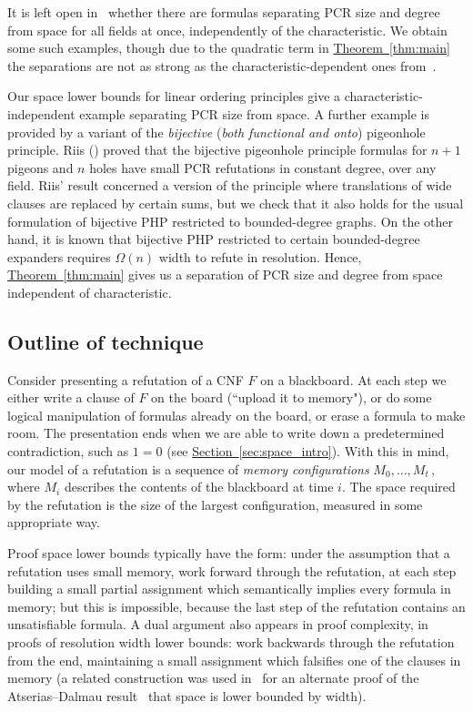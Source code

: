 \documentclass[11pt]{article}
\numberwithin{equation}{section}
\theoremstyle{definition}
\theoremstyle{plain}
\newcommand{\expref}[2]{\hyperref[#2]{#1~\ref{#2}}}
\begin{document}
\smallskip 
{}
It is left open in~\cite{DBLP:conf/icalp/FilmusLMNV13} whether there are formulas
separating PCR size and degree from space for all fields at once, independently of the characteristic. 
We obtain some such examples, though due to the quadratic term in \expref{Theorem}{thm:main}
the separations are not as strong as the characteristic-dependent ones from~\cite{DBLP:conf/icalp/FilmusLMNV13}.

Our space lower bounds for linear ordering principles give a characteristic-independent example separating PCR size from space.
A further example is provided by a variant of the \emph{bijective} (\emph{both functional and onto}) pigeonhole principle. 
Riis (\cite{riis,DBLP:conf/dlt/Razborov01}) proved that the bijective pigeonhole principle formulas for $n+1$ pigeons and $n$ holes 
have small PCR refutations in constant degree, over any field. Riis' result concerned a version of the principle 
where translations of wide clauses are replaced by certain sums, but we check that it also holds for the usual formulation
of bijective PHP restricted to bounded-degree graphs.
On the other hand, it is known that bijective PHP restricted to certain
bounded-degree expanders requires $\Omega(n)$ width to refute in resolution.  
Hence, \expref{Theorem}{thm:main} gives us a separation of PCR size and degree from space independent of characteristic.
 
\subsection{Outline of technique} 
\label{subsec:outline}

Consider presenting a refutation of a CNF $F$ on a blackboard.
At each step we either write a clause of $F$ on the board
(``upload it to memory"), or do some logical manipulation
of formulas already on the board, or erase a formula to 
make room. The presentation ends when we 
are able to write down a predetermined contradiction,
such as $1=0$ (see \expref{Section}{sec:space_intro}).
With this in mind, our model of a refutation is a
sequence of \emph{memory configurations}
$M_0, \ldots, M_t$\,, where $M_i$ describes the contents
of the blackboard at time $i$. The space required
by the refutation is the size of the largest configuration,
measured in some appropriate way.

Proof space lower bounds  typically have the form:
under the assumption that a refutation uses small memory, 
 work forward through the refutation, 
at each step building a small partial assignment which semantically implies every formula in memory;
but this is impossible, because the last step of the refutation contains an unsatisfiable formula.  
A dual argument also appears in proof complexity, in proofs of resolution width lower bounds:
work backwards through the refutation from the end, 
maintaining a small assignment which falsifies one of the clauses 
in memory (a related construction was used in~\cite{DBLP:journals/tocl/FilmusLMNV15}
for an alternate proof of the Atserias--Dalmau
result~\cite{DBLP:journals/jcss/AtseriasD08} that space is lower bounded by width).
\end{document}

